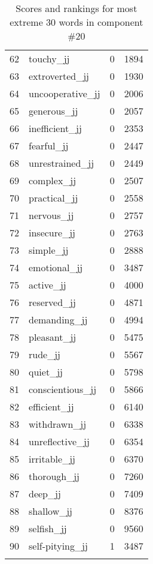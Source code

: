 \begin{longtable}[!htbp]{| rlr@{.}l |}
    62 & touchy\_jj & 0 & 1894 \\
    63 & extroverted\_jj & 0 & 1930 \\
    64 & uncooperative\_jj & 0 & 2006 \\
    65 & generous\_jj & 0 & 2057 \\
    66 & inefficient\_jj & 0 & 2353 \\
    67 & fearful\_jj & 0 & 2447 \\
    68 & unrestrained\_jj & 0 & 2449 \\
    69 & complex\_jj & 0 & 2507 \\
    70 & practical\_jj & 0 & 2558 \\
    71 & nervous\_jj & 0 & 2757 \\
    72 & insecure\_jj & 0 & 2763 \\
    73 & simple\_jj & 0 & 2888 \\
    74 & emotional\_jj & 0 & 3487 \\
    75 & active\_jj & 0 & 4000 \\
    76 & reserved\_jj & 0 & 4871 \\
    77 & demanding\_jj & 0 & 4994 \\
    78 & pleasant\_jj & 0 & 5475 \\
    79 & rude\_jj & 0 & 5567 \\
    80 & quiet\_jj & 0 & 5798 \\
    81 & conscientious\_jj & 0 & 5866 \\
    82 & efficient\_jj & 0 & 6140 \\
    83 & withdrawn\_jj & 0 & 6338 \\
    84 & unreflective\_jj & 0 & 6354 \\
    85 & irritable\_jj & 0 & 6370 \\
    86 & thorough\_jj & 0 & 7260 \\
    87 & deep\_jj & 0 & 7409 \\
    88 & shallow\_jj & 0 & 8376 \\
    89 & selfish\_jj & 0 & 9560 \\
    90 & self-pitying\_jj & 1 & 3487 \\
    \hline
    \caption{Scores and rankings for most extreme 30 words in component \#20} \\
\end{longtable}
